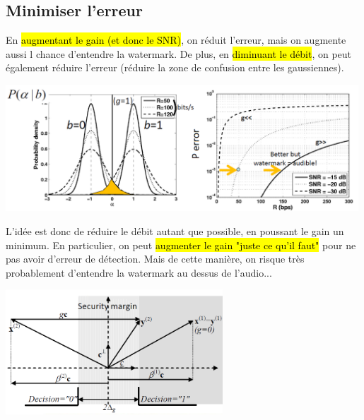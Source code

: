 \documentclass[letterpaper, 12pt]{article}
\newcommand{\alinea}{
\hspace*{0.5cm}}
\begin{document}
		\subsection{Minimiser l'erreur}
			\alinea En \hl{augmentant le gain (et donc le SNR)}, on réduit l'erreur, mais on augmente aussi l chance d'entendre 
				la watermark. De plus, en \hl{diminuant le débit}, on peut également réduire l'erreur (réduire la zone de confusion 
				entre les gaussiennes).
			\begin{center}
				\includegraphics[width=5.2in]{Images/watermark-error}
			\end{center}
			\alinea L'idée est donc de réduire le débit autant que possible, en poussant le gain un minimum. En particulier, on peut
				\hl{augmenter le gain "juste ce qu'il faut"} pour ne pas avoir d'erreur de détection. Mais de cette manière, on risque
				très probablement d'entendre la watermark au dessus de l'audio...
			\begin{center}
				\includegraphics[width=3.2in]{Images/watermark-security}
			\end{center}
\end{document}
